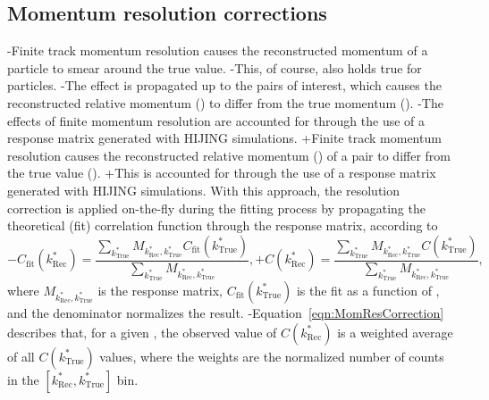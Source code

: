 \begin{table}[htbp]
 \subsection{Momentum resolution corrections}
 \label{MomentumResolutionCorrections}
 
-Finite track momentum resolution causes the reconstructed momentum of a particle to smear around the true value.
-This, of course, also holds true for \Vz particles.
-The effect is propagated up to the pairs of interest, which causes the reconstructed relative momentum (\krec) to differ from the true momentum (\ktrue).
-The effects of finite momentum resolution are accounted for through the use of a response matrix generated with HIJING simulations.
+Finite track momentum resolution causes the reconstructed relative momentum (\krec) of a pair to differ from the true value (\ktrue).
+This is accounted for through the use of a response matrix generated with HIJING simulations.
 With this approach, the resolution correction is applied on-the-fly during the fitting process by propagating the theoretical (fit) correlation function through the response matrix, according to
 \begin{equation}
-  C_{\mathrm{fit}}(k^{*}_{\mathrm{Rec}}) = \dfrac{\sum\limits_{k^{*}_{\mathrm{True}}}M_{k^{*}_{\mathrm{Rec}},k^{*}_{\mathrm{True}}}C_{\mathrm{fit}}(k^{*}_{\mathrm{True}})}{\sum\limits_{k^{*}_{\mathrm{True}}}M_{k^{*}_{\mathrm{Rec}},k^{*}_{\mathrm{True}}}},
+  C(k^{*}_{\mathrm{Rec}}) = \dfrac{\sum\limits_{k^{*}_{\mathrm{True}}}M_{k^{*}_{\mathrm{Rec}},k^{*}_{\mathrm{True}}}C(k^{*}_{\mathrm{True}})}{\sum\limits_{k^{*}_{\mathrm{True}}}M_{k^{*}_{\mathrm{Rec}},k^{*}_{\mathrm{True}}}},
 \label{eqn:MomResCorrection}
 \end{equation}
 where $M_{k^{*}_{\mathrm{Rec}},k^{*}_{\mathrm{True}}}$ is the response matrix, $C_{\mathrm{fit}}(k^{*}_{\mathrm{True}})$ is the fit as a function of \ktrue, and the denominator normalizes the result.
-Equation~\ref{eqn:MomResCorrection} describes that, for a given \krec, the observed value of $C(k^{*}_{\mathrm{Rec}})$ is a weighted average of all $C(k^{*}_{\mathrm{True}})$ values, where the weights are the normalized number of counts in the \mbox{$[k^{*}_{\mathrm{Rec}}, k^{*}_{\mathrm{True}}]$} bin.
 

\end{table}
